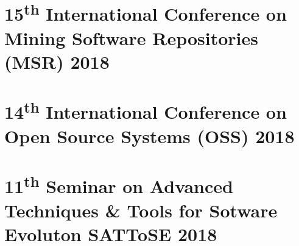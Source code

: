 \documentclass[a4paper, 12pt]{book}
\begin{document}
\newpage
\section{15\textsuperscript{th} International Conference on Mining Software Repositories (MSR) 2018}
\label{MSR}
%


\section{14\textsuperscript{th} International Conference on Open Source Systems (OSS) 2018}
\label{OSS}
%


\section{11\textsuperscript{th} Seminar on Advanced Techniques \& Tools for Sotware Evoluton SATToSE 2018}
\label{SATToSE}
%
\end{document}
